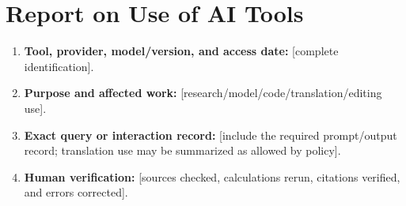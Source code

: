 \section*{Report on Use of AI Tools}
\begin{enumerate}
  \item \textbf{Tool, provider, model/version, and access date:} [complete identification].
  \item \textbf{Purpose and affected work:} [research/model/code/translation/editing use].
  \item \textbf{Exact query or interaction record:} [include the required prompt/output record; translation use may be summarized as allowed by policy].
  \item \textbf{Human verification:} [sources checked, calculations rerun, citations verified, and errors corrected].
\end{enumerate}
